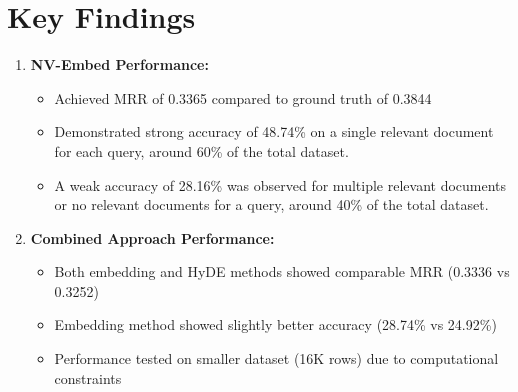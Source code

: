 \section{Key Findings}
\begin{enumerate}
    \item \textbf{NV-Embed Performance:}
    \begin{itemize}
        \item Achieved MRR of 0.3365 compared to ground truth of 0.3844
        \item Demonstrated strong accuracy of 48.74\% on a single relevant document for each query, around 60\% of the total dataset.
        \item A weak accuracy of 28.16\% was observed for multiple relevant documents or no relevant documents for a query, around 40\% of the total dataset.
    \end{itemize}
    
    \item \textbf{Combined Approach Performance:}
    \begin{itemize}
        \item Both embedding and HyDE methods showed comparable MRR (0.3336 vs 0.3252)
        \item Embedding method showed slightly better accuracy (28.74\% vs 24.92\%)
        \item Performance tested on smaller dataset (16K rows) due to computational constraints
    \end{itemize}
\end{enumerate}

